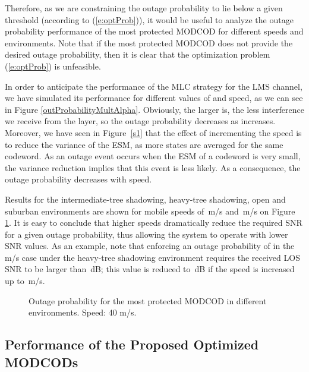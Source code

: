 \documentclass[journal,onecolumn,10pt,a4paper]{IEEEtran}
\begin{document}
Therefore, as we are constraining the outage probability to lie below a given threshold (according to (\ref{e:optProb})), it would be useful to analyze the outage probability performance of the most protected MODCOD for different speeds and environments. Note that if the most protected MODCOD does not provide the desired outage probability, then it is clear that the optimization problem (\ref{e:optProb}) is unfeasible.

In order to anticipate the performance of the MLC strategy for the LMS channel, we have simulated its performance for different values of  and speed, as we can see in Figure \ref{outProbabilityMultAlpha}. Obviously, the larger  is, the less interference we receive from the  layer, so the outage probability decreases as  increases. Moreover, we have seen in Figure~\ref{s1} that the effect of incrementing the speed is to reduce the variance of the ESM, as more states are averaged for the same codeword. As an outage event occurs when the ESM of a codeword is very small, the variance reduction implies that this event is less likely. As a consequence, the outage probability decreases with speed.

Results for the intermediate-tree shadowing, heavy-tree shadowing, open and suburban environments are shown for mobile speeds of \,m/s and \,m/s on Figure \ref{f:outage-40ms}. It is easy to conclude that higher speeds dramatically reduce the required SNR for a given outage probability, thus allowing the system to operate with lower SNR values. As an example, note that enforcing an outage probability of  in the \,m/s case under the heavy-tree shadowing environment requires the received LOS SNR to be larger than \,dB; this value is reduced to \,dB if the speed is increased up to \,m/s.







\begin{figure}
\hspace{-.7cm}
\hspace*{-0.9cm}
\caption{Outage probability for the most protected MODCOD in different environments. Speed: 40 m/s.}
\label{f:outage-40ms}
\end{figure}


\subsection{Performance of the Proposed Optimized MODCODs}
\end{document}
